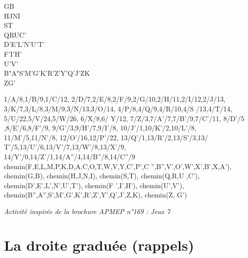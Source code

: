 \begin{activite}
\begin{QCM}
\begin{minipage}{4cm}
         GB \\ [3mm]
         HJNI \\ [3mm]
         ST \\ [3mm]
         QRUC’ \\ [3mm]
         D’E’L’N’U’T’ \\ [3mm]
         F’I’H’ \\ [3mm]
         U’V’ \\ [3mm]
         B"A"S’M’G’K’R’Z’Y’Q’J’ZK \\ [3mm]
         ZG’
      \end{minipage}
      \qquad
      \begin{minipage}{10cm}
            {1/A/8,1/B/9,1/C/12,
            2/D/7,2/E/8,2/F/9,2/G/10,2/H/11,2/I/12,2/J/13,
            3/K/7,3/L/8,3/M/9,3/N/13,3/O/14,
            4/P/8,4/Q/9,4/R/10,4/S /13,4/T/14,
            5/U/22,5/V/24,5/W/26,
            6/X/8,6/ Y/12,
            7/Z/3,7/A'/7,7/B'/9,7/C'/11,
            8/D'/5 ,8/E'/6,8/F'/9,
            9/G'/3,9/H'/7,9/I'/8,
            10/J'/1,10/K'/2,10/L'/8,
            11/M'/5,11/N'/8,
            12/O'/16,12/P'/22,
            13/Q'/1,13/R'/2,13/S'/3,13/ T'/5,13/U'/6,13/V'/7,13/W'/8,13/X'/9,
            14/Y'/0,14/Z'/1,14/A''/4,14/B''/8,14/C''/9}
            {chemin(F,E,L,M,P,K,D,A,C,O,T,W,V,Y,C',P',C '',B'',V',O',W',X',B',X,A'),
            chemin(G,B),
            chemin(H,J,N,I),
            chemin(S,T),
            chemin(Q,R,U ,C'),
            chemin(D',E',L',N',U',T'),
            chemin(F ',I',H'),
            chemin(U',V'),
            chemin(B'',A'',S',M',G',K',R',Z',Y',Q',J',Z,K),
            chemin(Z, G')}
      \end{minipage} \smallskip
   \end{QCM}
   \vfill\hfill{\it\small Activité inspirée de la brochure APMEP n°169 : \og Jeux 7 \fg}
\end{activite}


\cours 

\section{La droite graduée (rappels)}

